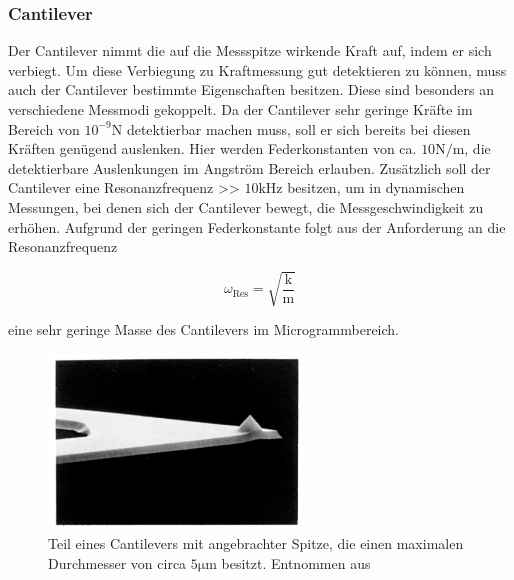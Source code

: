           \FloatBarrier

        
          \newpage
        \subsubsection*{Cantilever}
          Der Cantilever nimmt die auf die Messspitze wirkende Kraft auf, indem er sich verbiegt. Um diese Verbiegung zu Kraftmessung gut detektieren zu können, muss auch der Cantilever bestimmte Eigenschaften
          besitzen. Diese sind besonders an verschiedene Messmodi gekoppelt. Da der Cantilever sehr geringe Kräfte im Bereich von $10^{-9} \si{\newton}$ detektierbar machen muss, soll er sich bereits bei diesen
          Kräften genügend auslenken. Hier werden Federkonstanten von ca. $10 \si{\newton\per\metre}$, die detektierbare Auslenkungen im Angström Bereich erlauben. Zusätzlich soll der Cantilever eine  
          Resonanzfrequenz >> $10 \si{\kilo\hertz}$ besitzen, um in dynamischen Messungen, bei denen sich der Cantilever bewegt, die Messgeschwindigkeit zu erhöhen. Aufgrund der geringen Federkonstante folgt
          aus der Anforderung an die Resonanzfrequenz

          \begin{equation*}
            \omega_{\text{Res}} = \sqrt{\frac{\text{k}}{\text{m}}}
          \end{equation*}

          eine sehr geringe Masse des Cantilevers im Microgrammbereich.


          \begin{figure}[h]
            \centering
            \includegraphics[width = 0.6\textwidth]{pictures/Cantilever_Spitze.png}
            \caption{Teil eines Cantilevers mit angebrachter Spitze, die einen maximalen Durchmesser von circa $5 \si{\micro\metre}$ besitzt. Entnommen aus \cite{wiesendanger_scanning_1998}}
            \label{fig:Cantilever_Spitze}
          \end{figure}
        
